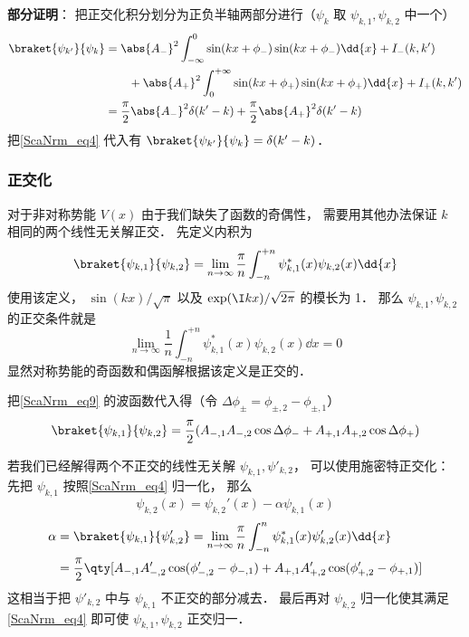 \textbf{部分证明}： 把正交化积分划分为正负半轴两部分进行（$\psi_{k}$ 取 $\psi_{k,1}, \psi_{k,2}$ 中一个）
\begin{equation}
\begin{aligned}
\braket{\psi_{k'}}{\psi_{k}} &= \abs{A_-}^2\int_{-\infty}^0 \sin(kx + \phi_{-})\sin(kx + \phi_{-}) \dd{x} + I_-(k,k')\\
&\qquad+ \abs{A_+}^2\int_0^{+\infty} \sin(kx + \phi_{+})\sin(kx + \phi_{+}) \dd{x}   + I_+(k,k')\\
&= \frac{\pi}{2}\abs{A_-}^2\delta(k'-k) + \frac{\pi}{2}\abs{A_+}^2 \delta(k'-k)
\end{aligned}
\end{equation}
把\autoref{ScaNrm_eq4} 代入有 $\braket{\psi_{k'}}{\psi_{k}} = \delta(k'-k)$．

\subsubsection{正交化}
对于非对称势能 $V(x)$ 由于我们缺失了函数的奇偶性， 需要用其他办法保证 $k$ 相同的两个线性无关解正交． 先定义内积为
\begin{equation}
\braket{\psi_{k,1}}{\psi_{k,2}} = \lim_{n\to\infty}\frac{\pi}{n}\int_{-n}^{+n} \psi_{k,1}^*(x) \psi_{k,2}(x) \dd{x}
\end{equation}
使用该定义， $\sin(kx)/\sqrt{\pi}$ 以及 $\exp(\I kx)/\sqrt{2\pi}$ 的模长为 1． 那么 $\psi_{k,1}, \psi_{k,2}$ 的正交条件就是
\begin{equation}\label{ScaNrm_eq7}
\lim_{n\to\infty}\frac{1}{n}\int_{-n}^{+n} \psi_{k,1}^*(x) \psi_{k,2}(x) \dd{x} = 0
\end{equation}
显然对称势能的奇函数和偶函解根据该定义是正交的．

把\autoref{ScaNrm_eq9} 的波函数代入得（令 $\Delta\phi_\pm = \phi_{\pm, 2} - \phi_{\pm, 1}$）
\begin{equation}
\braket{\psi_{k,1}}{\psi_{k,2}} = \frac{\pi}{2}(A_{-,1}A_{-,2}\cos\Delta\phi_- + A_{+,1}A_{+,2}\cos\Delta\phi_+)
\end{equation}


若我们已经解得两个不正交的线性无关解 $\psi_{k,1}, \psi'_{k,2}$， 可以使用施密特正交化： 先把 $\psi_{k,1}$ 按照\autoref{ScaNrm_eq4} 归一化， 那么
\begin{equation}
\psi_{k,2}(x) = \psi_{k,2}'(x) - \alpha \psi_{k,1}(x)
\end{equation}
\begin{equation}\label{ScaNrm_eq5}
\begin{aligned}
\alpha &= \braket{\psi_{k,1}}{\psi'_{k,2}} = \lim_{n\to\infty} \frac{\pi}{n} \int_{-n}^n \psi_{k,1}^*(x) \psi'_{k,2}(x) \dd{x}\\
&= \frac{\pi}{2} \qty[A_{-,1}A'_{-,2}\cos(\phi_{-,2}'-\phi_{-,1}) + A_{+,1}A'_{+,2}\cos(\phi_{+,2}'-\phi_{+,1})]
\end{aligned}
\end{equation}
这相当于把 $\psi'_{k,2}$ 中与 $\psi_{k,1}$ 不正交的部分减去． 最后再对 $\psi_{k,2}$ 归一化使其满足\autoref{ScaNrm_eq4} 即可使 $\psi_{k,1}, \psi_{k,2}$ 正交归一．

